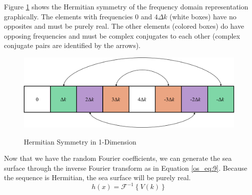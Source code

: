 Figure \ref{os_fig:6ab} shows the Hermitian symmetry of the frequency domain representation graphically. The elements with frequencies $0$ and $4\Delta k$ (white boxes) have no opposites and must be purely real. The other elements (colored boxes) do have opposing frequencies and must be complex conjugates to each other (complex conjugate pairs are identified by the arrows).
\begin{figure}[H]
  \begin{center}
\includegraphics[width=5in]{../media/Ocean_Surface/1-d_hermitian_symmetry.png}
  \end{center}
  \renewcommand{\baselinestretch}{1} \small\normalsize
  \begin{quote}
    \caption[Hermitian Symmetry in 1-Dimension]{Hermitian Symmetry in 1-Dimension\label{os_fig:6ab}}
  \end{quote}
\end{figure}
\renewcommand{\baselinestretch}{2} \small\normalsize
Now that we have the random Fourier coefficients, we can generate the sea surface through the inverse Fourier transform as in Equation \ref{os_eq:9}. Because the sequence is Hermitian, the sea surface will be purely real.
\begin{equation}
  \label{os_eq:9}
  h(x) = \mathcal{F}^{-1}\left\{V(k) \right\}
  \end{equation}

